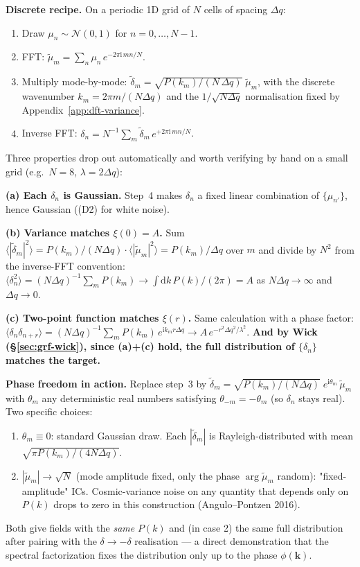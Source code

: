 \documentclass[12pt]{article}
\newcommand{\bk}{\mathbf{k}}
\begin{document}
\textbf{Discrete recipe.}  On a periodic 1D grid of $N$ cells of
spacing $\Delta q$:
\begin{enumerate}
  \item Draw $\mu_n \sim \mathcal{N}(0, 1)$ for $n = 0, \dots, N-1$.
  \item FFT: $\tilde\mu_m = \sum_n \mu_n\,e^{-2\pi\mathrm i\,m n / N}$.
  \item Multiply mode-by-mode: $\tilde\delta_m =
        \sqrt{P(k_m)/(N\,\Delta q)}\;\tilde\mu_m$, with the
        discrete wavenumber $k_m = 2\pi m / (N\Delta q)$ and the
        $1/\sqrt{N\Delta q}$ normalisation fixed by
        Appendix~\ref{app:dft-variance}.
  \item Inverse FFT: $\delta_n = N^{-1}\sum_m \tilde\delta_m\,
        e^{+2\pi\mathrm i\,m n / N}$.
\end{enumerate}
Three properties drop out automatically and worth verifying by
hand on a small grid (e.g.\ $N = 8$, $\lambda = 2\Delta q$):

\textbf{(a) Each $\delta_n$ is Gaussian.}  Step~4 makes $\delta_n$
a fixed linear combination of $\{\mu_{n'}\}$, hence Gaussian
((D2) for white noise).

\textbf{(b) Variance matches $\xi(0) = A$.}  Sum
$\langle|\tilde\delta_m|^2\rangle = P(k_m)/(N\Delta q) \cdot
\langle|\tilde\mu_m|^2\rangle = P(k_m)/\Delta q$ over $m$ and
divide by $N^2$ from the inverse-FFT convention:
$\langle\delta_n^2\rangle = (N\Delta q)^{-1}\sum_m P(k_m) \to
\int\!\mathrm d k\,P(k)/(2\pi) = A$ as $N\Delta q \to \infty$ and
$\Delta q \to 0$.

\textbf{(c) Two-point function matches $\xi(r)$.}  Same
calculation with a phase factor:
$\langle\delta_n\delta_{n+r}\rangle = (N\Delta q)^{-1}\sum_m P(k_m)\,
e^{\mathrm i k_m r \Delta q} \to A\,e^{-r^2\Delta q^2/\lambda^2}$.
\textbf{And by Wick (\S\ref{sec:grf-wick}), since (a)+(c) hold,
the full distribution of $\{\delta_n\}$ matches the target.}

\textbf{Phase freedom in action.}  Replace step~3 by
$\tilde\delta_m = \sqrt{P(k_m)/(N\Delta q)}\;e^{\mathrm i\theta_m}\,
\tilde\mu_m$ with $\theta_m$ any deterministic real numbers
satisfying $\theta_{-m} = -\theta_m$ (so $\delta_n$ stays real).
Two specific choices:
\begin{enumerate}
  \item $\theta_m \equiv 0$: standard Gaussian draw.  Each
        $|\tilde\delta_m|$ is Rayleigh-distributed with mean
        $\sqrt{\pi P(k_m)/(4 N\Delta q)}$.
  \item $|\tilde\mu_m| \to \sqrt{N}$ (mode amplitude fixed, only
        the phase $\arg\tilde\mu_m$ random): "fixed-amplitude" ICs.
        Cosmic-variance noise on any quantity that depends only on
        $P(k)$ drops to zero in this construction (Angulo--Pontzen
        2016).
\end{enumerate}
Both give fields with the \emph{same} $P(k)$ and (in case 2) the
same full distribution after pairing with the $\delta \to -\delta$
realisation --- a direct demonstration that the spectral
factorization fixes the distribution only up to the phase
$\phi(\bk)$.
\end{document}
